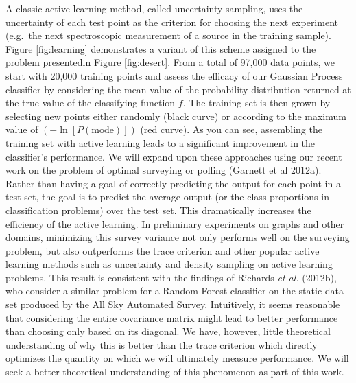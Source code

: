 \documentclass[useAMS,usenatbib,tightenlines,11pt,preprint]{aastex}
\begin{document}
A classic active learning method, called uncertainty sampling, uses
the uncertainty of each test point as the criterion for choosing the
next experiment (e.g.\ the next spectroscopic measurement of a source
in the training sample).  
Figure \ref{fig:learning} demonstrates a variant of this scheme assigned to the
problem presentedin Figure \ref{fig:desert}. From a total of 97,000 data points,
we start with 20,000 training points and assess the efficacy of our Gaussian
Process classifier by considering the mean value of the probability distribution
returned at the true value of the classifying function $f$.  The training set is
then grown by selecting new points either randomly (black curve) or according to
the maximum value of $\left(-\ln[P(\text{mode})]\right)$ (red curve).  As you can see,
assembling the training set with active learning leads to a significant
improvement in the classifier's performance.
We will expand upon these approaches using
our recent work on the problem of optimal surveying or polling
(Garnett et al 2012a).  Rather than having a goal of correctly
predicting the output for each point in a test set, the goal is to
predict the average output (or the class proportions in classification
problems) over the test set.  This dramatically increases the
efficiency of the active learning.  In preliminary experiments on
graphs and other domains, minimizing this survey variance not only
performs well on the surveying problem, but also outperforms the trace
criterion and other popular active learning methods such as
uncertainty and density sampling on active learning problems.
This result is consistent with the findings of Richards {\it et al.} (2012b),
who consider a similar problem for a Random Forest classifier on 
the static data set produced by the All Sky Automated Survey.
Intuitively, it seems reasonable that considering the entire
covariance matrix might lead to better performance than choosing only
based on its diagonal.  We have, however, little theoretical understanding of
why this is better than the trace criterion which directly optimizes
the quantity on which we will ultimately measure performance.  We will
seek a better theoretical understanding of this phenomenon as part of
this work.
\end{document}
